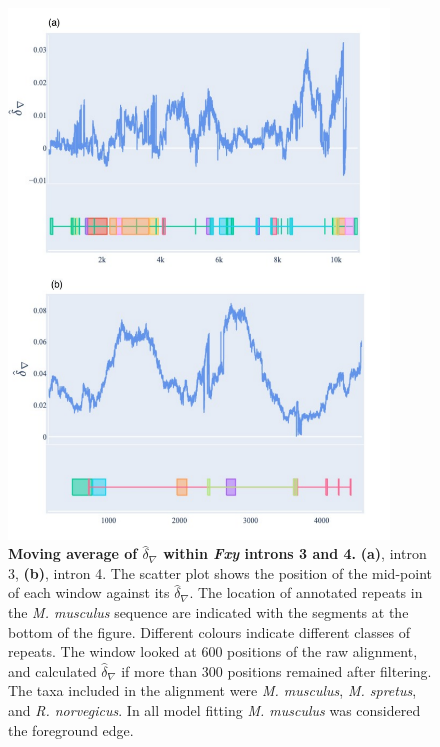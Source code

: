 \begin{figure}[htbp]
\centering
\includegraphics[width=0.9\textwidth]{figures/plots/rodent/dconv-intron3_4.pdf}
\caption[Moving average of $\hat\delta_\nabla$ within \textit{Fxy} introns 3 and 4]{\textbf{Moving average of $\hat\delta_\nabla$ within \textit{Fxy} introns 3 and 4.} \textbf{(a)}, intron 3, \textbf{(b)}, intron 4. The scatter plot shows the position of the mid-point of each window against its $\hat\delta_\nabla$. The location of annotated repeats in the \textit{M. musculus} sequence are indicated with the segments at the bottom of the figure. Different colours  indicate different classes of repeats. The window looked at 600 positions of the raw alignment, and calculated $\hat\delta_\nabla$ if more than 300 positions remained after filtering. The taxa included in the alignment were \textit{M. musculus}, \textit{M. spretus}, and \textit{R. norvegicus}. In all model fitting \textit{M. musculus} was considered the foreground edge. }
\label{fig:rodent/d-conv/intron3_4}
\end{figure}